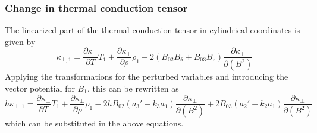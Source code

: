 \documentclass[11pt, fleqn]{article}
\begin{document}
\subsubsection{Change in thermal conduction tensor}
The linearized part of the thermal conduction tensor in cylindrical coordinates is given by
\begin{equation}
	\kappa_{\bot, 1} = \frac{\partial \kappa_\bot}{\partial T}T_1 + \frac{\partial \kappa_\bot}{\partial \rho}\rho_1 + 2\left(B_{02}B_\theta + B_{03}B_z\right)\frac{\partial \kappa_\bot}{\partial(B^2)}
\end{equation}
Applying the transformations for the perturbed variables and introducing the vector potential for $B_1$, this can be rewritten as
\begin{equation}
	h\kappa_{\bot, 1} = \frac{\partial \kappa_\bot}{\partial T}T_1 + \frac{\partial \kappa_\bot}{\partial \rho}\rho_1 - 2hB_{02}\left(a_3' - k_3a_1\right)\frac{\partial \kappa_\bot}{\partial (B^2)}
											+ 2B_{03}\left(a_2' - k_2a_1\right)\frac{\partial \kappa_\bot}{\partial (B^2)}
\end{equation}
which can be substituted in the above equations.
\end{document}
